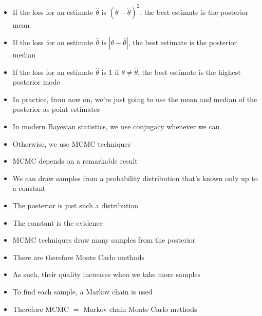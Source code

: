 \documentclass{beamer}
\begin{document}
\frame
{
  \begin{itemize}
    \item{If the loss for an estimate $\hat{\theta}$ is $(\theta - \hat{\theta})^2$, the best estimate is the posterior mean}
    \item{If the loss for an estimate $\hat{\theta}$ is $|\theta - \hat{\theta}|$, the best estimate is the posterior median}
    \item{If the loss for an estimate $\hat{\theta}$ is $1$ if $\theta \neq \hat{\theta}$, the best estimate is the highest posterior mode}
  \end{itemize}
}

\frame
{
  \begin{itemize}
    \item{In practice, from now on, we're just going to use the mean and median of the posterior as point estimates}
  \end{itemize}
}

\begin{frame}
  \begin{itemize}
    \item{In modern Bayesian statistics, we use conjugacy whenever we can}
    \item{Otherwise, we use MCMC techniques}
  \end{itemize}
\end{frame}

\frame
{
  \begin{itemize}
    \item{MCMC depends on a remarkable result}
    \item{We can draw samples from a probability distribution that's known only up to a constant}
    \item{The posterior is just such a distribution}
    \item{The constant is the evidence}
  \end{itemize}
}

\begin{frame}
  \begin{itemize}
    \item{MCMC techniques draw many samples from the posterior}
    \item{There are therefore Monte Carlo methods}
    \item{As such, their quality increases when we take more samples}
    \item{To find each sample, a Markov chain is used}
    \item{Therefore MCMC $=$ Markov chain Monte Carlo methods}
  \end{itemize}
\end{frame}
\end{document}
